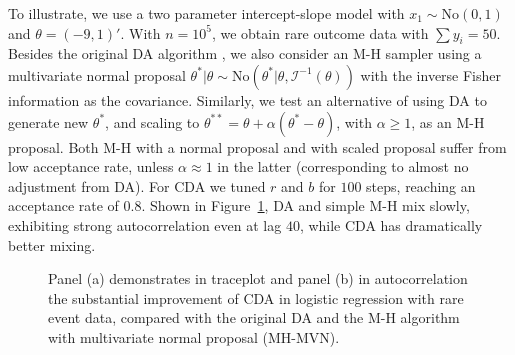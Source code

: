\documentclass[12pt]{article}
\newcommand{\mc}[1]{\mathcal{#1}}
\newcommand{\No}{\text{No}}
\begin{document}
To illustrate, we use a two parameter intercept-slope model with $x_1\sim \No(0,1)$ and $\theta=(-9,1)'$. With $n= 10^5$, we obtain rare outcome data with 
$\sum y_{i} = 50 $.  Besides the original DA algorithm  \citep{polson2013bayesian}, we also consider an M-H sampler using a multivariate normal proposal $\theta^*|\theta \sim \No(\theta^*| \theta, {\mc I}^{-1}(\theta))$ with the inverse Fisher information as the covariance. {Similarly, we test an alternative of using DA to generate new $\theta^*$, and scaling to $\theta^{**}=\theta+\alpha(\theta^{*}-\theta)$, with $\alpha\ge 1$, as an M-H proposal. Both M-H with a normal proposal and with scaled proposal suffer from low acceptance rate, unless $\alpha\approx 1$ in the latter (corresponding to almost no adjustment from DA).} For CDA we tuned $r$ and $b$ for $100$ steps, reaching an acceptance rate of $0.8$.  Shown in Figure~\ref{logit_random_mixing}, DA and simple M-H mix slowly, exhibiting strong autocorrelation even at lag $40$, while CDA has dramatically better mixing.



\begin{figure}[H]
  {%
    \qquad
  }
  {\caption{Panel (a) demonstrates in traceplot and panel (b) in autocorrelation the substantial improvement of CDA in logistic regression with rare event data, compared with the original DA \citep{polson2013bayesian} and the M-H algorithm with multivariate normal proposal (MH-MVN).\label{logit_random_mixing}}}
\end{figure}
\end{document}
